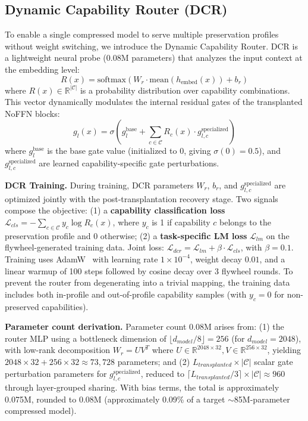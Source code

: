 \documentclass[twocolumn]{article}
\begin{document}
\subsection{Dynamic Capability Router (DCR)}

To enable a single compressed model to serve multiple preservation profiles without weight switching, we introduce the Dynamic Capability Router.
DCR is a lightweight neural probe (0.08M parameters) that analyzes the input context at the embedding level:
\begin{equation}
R(x) = \text{softmax}(W_r \cdot \text{mean}(h_{\text{embed}}(x)) + b_r)
\end{equation}
where $R(x) \in \mathbb{R}^{|\mathcal{C}|}$ is a probability distribution over capability combinations.
This vector dynamically modulates the internal residual gates of the transplanted NoFFN blocks:
\begin{equation}
g_l(x) = \sigma \!\left( g_l^{\text{base}} + \sum_{c \in \mathcal{C}} R_c(x) \cdot g_{l,c}^{\text{specialized}} \right)
\end{equation}
where $g_l^{\text{base}}$ is the base gate value (initialized to 0, giving $\sigma(0) = 0.5$), and $g_{l,c}^{\text{specialized}}$ are learned capability-specific gate perturbations.

\textbf{DCR Training.}
During training, DCR parameters $W_r$, $b_r$, and $g_{l,c}^{\text{specialized}}$ are optimized jointly with the post-transplantation recovery stage.
Two signals compose the objective: (1) a \textbf{capability classification loss} $\mathcal{L}_{cls} = -\sum_{c \in \mathcal{C}} y_c \log R_c(x)$, where $y_c$ is 1 if capability $c$ belongs to the preservation profile and 0 otherwise; (2) a \textbf{task-specific LM loss} $\mathcal{L}_{lm}$ on the flywheel-generated training data.
Joint loss: $\mathcal{L}_{dcr} = \mathcal{L}_{lm} + \beta \cdot \mathcal{L}_{cls}$, with $\beta = 0.1$.
Training uses AdamW~\citep{loshchilov2019adamw} with learning rate $1\times 10^{-4}$, weight decay $0.01$, and a linear warmup of 100 steps followed by cosine decay over 3 flywheel rounds.
To prevent the router from degenerating into a trivial mapping, the training data includes both in-profile and out-of-profile capability samples (with $y_c = 0$ for non-preserved capabilities).

\textbf{Parameter count derivation.}
Parameter count 0.08M arises from: (1) the router MLP using a bottleneck dimension of $\lfloor d_{model}/8 \rfloor = 256$ (for $d_{model}=2048$), with low-rank decomposition $W_r = U V^T$ where $U \in \mathbb{R}^{2048 \times 32}, V \in \mathbb{R}^{256 \times 32}$, yielding $2048 \times 32 + 256 \times 32 \approx 73,728$ parameters; and (2) $L_{transplanted} \times |\mathcal{C}|$ scalar gate perturbation parameters for $g_{l,c}^{\text{specialized}}$, reduced to $\lceil L_{transplanted}/3 \rceil \times |\mathcal{C}| \approx 960$ through layer-grouped sharing. With bias terms, the total is approximately 0.075M, rounded to 0.08M (approximately 0.09\% of a target $\sim$85M-parameter compressed model).
\end{document}

